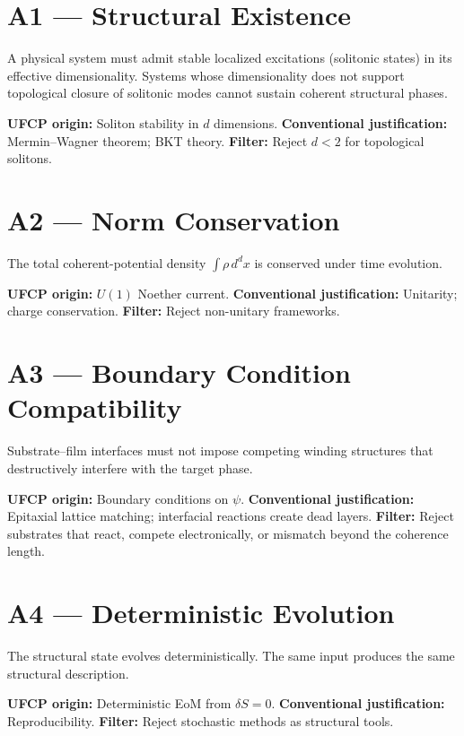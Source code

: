 \documentclass[11pt, a4paper]{article}
\begin{document}
\section{A1 --- Structural Existence}

A physical system must admit stable localized excitations
(solitonic states) in its effective dimensionality. Systems
whose dimensionality does not support topological closure of
solitonic modes cannot sustain coherent structural phases.

\textbf{UFCP origin:} Soliton stability in $d$ dimensions.
\textbf{Conventional justification:} Mermin--Wagner theorem;
BKT theory.
\textbf{Filter:} Reject $d < 2$ for topological solitons.

\section{A2 --- Norm Conservation}

The total coherent-potential density $\int \rho\, d^dx$ is
conserved under time evolution.

\textbf{UFCP origin:} $U(1)$ Noether current.
\textbf{Conventional justification:} Unitarity; charge conservation.
\textbf{Filter:} Reject non-unitary frameworks.

\section{A3 --- Boundary Condition Compatibility}

Substrate--film interfaces must not impose competing winding
structures that destructively interfere with the target phase.

\textbf{UFCP origin:} Boundary conditions on $\psi$.
\textbf{Conventional justification:} Epitaxial lattice matching;
interfacial reactions create dead layers.
\textbf{Filter:} Reject substrates that react, compete
electronically, or mismatch beyond the coherence length.

\section{A4 --- Deterministic Evolution}

The structural state evolves deterministically. The same input
produces the same structural description.

\textbf{UFCP origin:} Deterministic EoM from $\delta S = 0$.
\textbf{Conventional justification:} Reproducibility.
\textbf{Filter:} Reject stochastic methods as structural tools.
\end{document}
